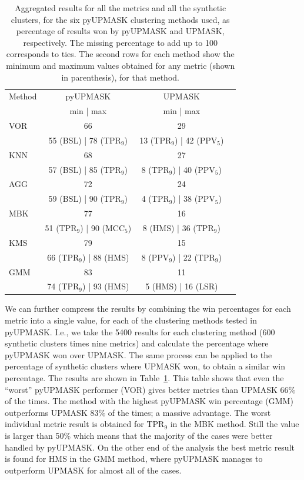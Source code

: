 \documentclass{aa}
\begin{document}
 \begin{table}
 \caption{Aggregated results for all the metrics and all the synthetic
 clusters, for the six pyUPMASK clustering methods used, as percentage of
 results won by pyUPMASK and UPMASK, respectively. The missing percentage to
 add up to 100 corresponds to ties.
 The second rows for each method show the minimum and maximum values obtained
 for any metric (shown in parenthesis), for that method.}
 \label{tab:results}
 \centering
 \begin{tabular}{l c c l}
 \hline\hline
 Method & pyUPMASK & UPMASK\\
  & min | max & min | max \\
 \hline
   VOR & 66 & 29 \\
   & 55 (BSL) | 78 (TPR$_9$) & 13 (TPR$_9$) | 42 (PPV$_5$)\\
   KNN & 68 & 27\\
   & 57 (BSL) | 85 (TPR$_9$) & 8 (TPR$_9$) | 40 (PPV$_5$)\\
   AGG & 72 & 24 \\
   & 59 (BSL) | 90 (TPR$_9$) & 4 (TPR$_9$) | 38 (PPV$_5$)\\
   MBK & 77 & 16\\
   & 51 (TPR$_9$) | 90 (MCC$_5$) & 8 (HMS) | 36 (TPR$_9$)\\
   KMS & 79 & 15\\
   & 66 (TPR$_9$) | 88 (HMS) & 8 (PPV$_9$) | 22 (TPR$_9$)\\
   GMM & 83 & 11\\
   & 74 (TPR$_9$) | 93 (HMS) & 5 (HMS) | 16 (LSR)\\
 \hline
 \end{tabular}
 \end{table}

 We can further compress the results by combining the win percentages for each
 metric into a single value, for each of the clustering methods tested in
 pyUPMASK. I.e., we take the 5400 results for each clustering method (600
 synthetic clusters times nine metrics) and calculate the percentage where
 pyUPMASK won over UPMASK. The same process can be applied to the percentage
 of synthetic clusters where UPMASK won, to obtain a similar win percentage.
 The results are shown in Table~\ref{tab:results}.
 This table shows that even the ``worst'' pyUPMASK performer (VOR) gives better
 metrics than UPMASK 66\% of the times. The method  with the highest pyUPMASK
 win percentage (GMM) outperforms UPMASK 83\% of the times; a massive
 advantage. The worst individual metric result is obtained for TPR$_9$ in the
 MBK method. Still the value is larger than 50\% which means that the majority
 of the cases were better handled by pyUPMASK. On the other end of the
 analysis the best metric result is found for HMS in the GMM method, where
 pyUPMASK manages to outperform UPMASK for almost all of the cases.\\
\end{document}
